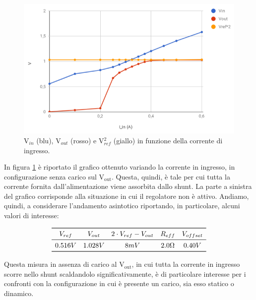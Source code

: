 \begin{figure}
\centering
\includegraphics[scale=.5]{Immagini/provaSLDO5}
\caption{V$_{in}$ (blu), V$_{out}$ (rosso) e V$_{ref}^2$ (giallo) in funzione della corrente di ingresso.}
\label{provaSLDO5}
\end{figure}

In figura \ref{provaSLDO5} è riportato il grafico ottenuto variando la corrente in ingresso, in configurazione senza carico sul $\mathrm{V_{out}}$.
Questa, quindi, è tale per cui tutta la corrente fornita dall'alimentazione viene assorbita dallo shunt.
La parte a sinistra del grafico corrisponde alla situazione in cui il regolatore non è attivo. Andiamo, quindi, a considerare l'andamento asintotico riportando, in particolare, alcuni valori di interesse:

\[
\begin{array}{ccccc}

\toprule
V_{ref} & V_{out} & 2 \cdot V_{ref}- V_{out} & R_{eff} & V_{offset} \\

\midrule

0.516 V & 1.028 V & 8 mV & 2.0 \Omega & 0.40 V \\

\bottomrule
\end{array}
\]

Questa misura in assenza di carico al $\mathrm{V_{out}}$, in cui tutta la corrente in ingresso scorre nello shunt scaldandolo significativamente, è di particolare interesse per i confronti con la configurazione in cui è presente un carico, sia esso statico o dinamico.

